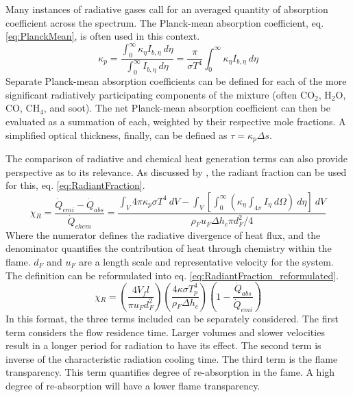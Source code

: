 Many instances of radiative gases call for an averaged quantity of absorption coefficient across the spectrum. The Planck-mean absorption coefficient, eq. \ref{eq:PlanckMean}, is often used in this context.
\begin{equation}
    \kappa{}_p = \frac{\int^\infty_0{\kappa{}_\eta{}I_{b,\eta}~d\eta}}{\int^\infty_0{I_{b,\eta}~d\eta}}=\frac{\pi}{\sigma{}T^4}\int^\infty_0{\kappa{}_\eta{}I_{b,\eta}~d\eta}
    \label{eq:PlanckMean}
\end{equation}
Separate Planck-mean absorption coefficients can be defined for each of the more significant radiatively participating components of the mixture (often CO$_2$, H$_2$O, CO, CH$_4$, and soot). The net Planck-mean absorption coefficient can then be evaluated as a summation of each, weighted by their respective mole fractions.
A simplified optical thickness, finally, can be defined as $\tau{}=\kappa{}_p\Delta{s}$.

The comparison of radiative and chemical heat generation terms can also provide perspective as to its relevance. As discussed by \citet{Liu2020TheFlames}, the radiant fraction can be used for this, eq. \ref{eq:RadiantFraction}.
\begin{equation}
    \chi{}_R=\frac{\dot{Q}_{emi}-\dot{Q}_{abs}}{\dot{Q}_{chem}}=\frac{\int_V{4\pi{}\kappa{}_p\sigma{}T^4~dV}-\int_V\left[\int_0^\infty{\left(\kappa{}_\eta{}\int_{4\pi}I_\eta{}~d\Omega\right)~d\eta{}}\right]~dV}{\rho{}_Fu_F\Delta{h}_c\pi{}d_F^2/4}
    \label{eq:RadiantFraction}
\end{equation}
Where the numerator defines the radiative divergence of heat flux, and the denominator quantifies the contribution of heat through chemistry within the flame. $d_F$ and $u_F$ are a length scale and representative velocity for the system.
The definition can be reformulated into eq. \ref{eq:RadiantFraction_reformulated}.
\begin{equation}
    \chi{}_R=\left(\frac{4V_fl}{\pi{}u_Fd_F^2}\right)\left(\frac{4\kappa{}\sigma{}T_p^4}{\rho{}_F\Delta{h}_c}\right)\left(1-\frac{\dot{Q}_{abs}}{\dot{Q}_{emi}}\right)
    \label{eq:RadiantFraction_reformulated}
\end{equation}
In this format, the three terms included can be separately considered. The first term considers the flow residence time. Larger volumes and slower velocities result in a longer period for radiation to have its effect.
The second term is inverse of the characteristic radiation cooling time. 
The third term is the flame transparency. This term quantifies degree of re-absorption in the fame. A high degree of re-absorption will have a lower flame transparency. 

